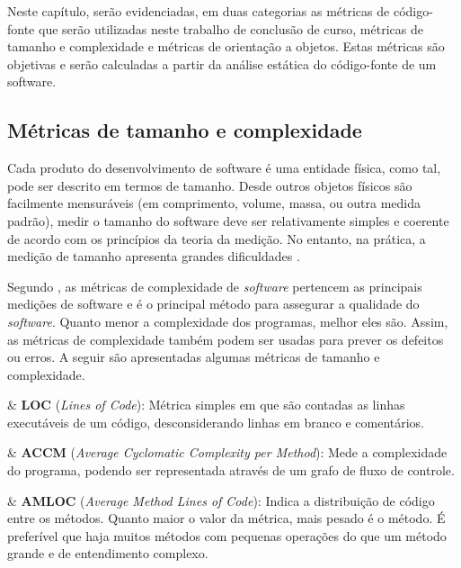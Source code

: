 Neste capítulo, serão evidenciadas, em duas categorias as métricas de código-fonte que serão utilizadas neste trabalho de conclusão de curso, métricas de tamanho e complexidade e métricas de orientação a objetos. Estas métricas são objetivas e serão calculadas a partir da análise estática do código-fonte de um software. 

\subsection{Métricas de tamanho e complexidade}

Cada produto do desenvolvimento de software é uma entidade física, como tal, pode ser descrito em termos de tamanho. Desde outros objetos físicos são facilmente mensuráveis (em comprimento, volume, massa, ou outra medida padrão), medir o tamanho do software deve ser relativamente simples e coerente de acordo com os princípios da teoria da medição. No entanto, na prática, a medição de tamanho apresenta grandes dificuldades \cite{Fenton98}. 

Segundo , as métricas de complexidade de  \textit{software} pertencem as principais medições de software e é o principal método para assegurar a qualidade do \textit{software}. Quanto menor a complexidade dos programas, melhor eles são. Assim, as métricas de complexidade também podem ser usadas para prever os defeitos ou erros. A seguir são apresentadas algumas métricas de tamanho e complexidade.

\begin{easylist}[itemize]

	& \textbf{LOC} (\textit{Lines of Code}): Métrica simples em que são contadas as linhas executáveis de um código, desconsiderando linhas em branco e comentários.  \cite{metricsandmodels} 
		
	& \textbf{ACCM} (\textit{Average Cyclomatic Complexity per Method}): Mede a complexidade do programa, podendo ser representada através de um grafo de fluxo de controle. \cite{McCabe76}

	& \textbf{AMLOC} (\textit{Average Method Lines of Code}): Indica a distribuição de código entre os métodos. Quanto maior o valor da métrica, mais pesado é o método. É preferível que haja muitos métodos com pequenas operações do que um método grande e de entendimento complexo. \cite{Meirelles2013}
	
\end{easylist}

